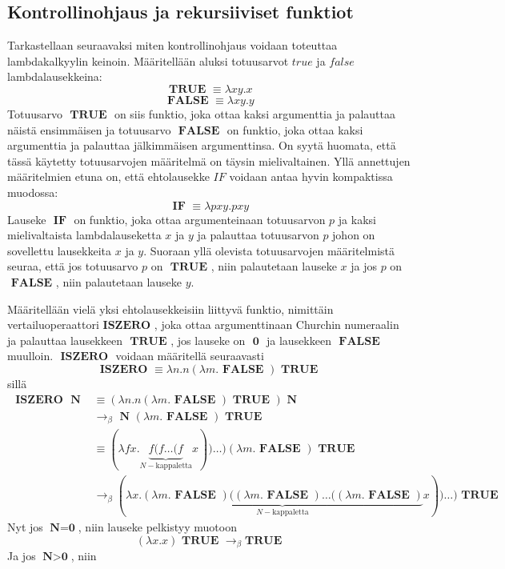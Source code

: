 \subsection{Kontrollinohjaus ja rekursiiviset funktiot}
Tarkastellaan seuraavaksi miten kontrollinohjaus voidaan toteuttaa lambdakalkyylin keinoin. Määritellään aluksi totuusarvot $true$ ja $false$ lambdalausekkeina:
\[ \textbf{ TRUE } \equiv \lambda x y . x \]
\[ \textbf{ FALSE } \equiv \lambda x y . y \]
Totuusarvo $\textbf{ TRUE }$ on siis funktio, joka ottaa kaksi argumenttia ja palauttaa näistä ensimmäisen ja totuusarvo $\textbf{ FALSE }$ on funktio, joka ottaa kaksi argumenttia ja palauttaa jälkimmäisen argumenttinsa. On syytä huomata, että tässä käytetty totuusarvojen määritelmä on täysin mielivaltainen. Yllä annettujen määritelmien etuna on, että ehtolausekke $IF$ voidaan antaa hyvin kompaktissa muodossa:
\[ \textbf{ IF } \equiv \lambda p x y . p x y \]  
Lauseke $\textbf{ IF }$ on funktio, joka ottaa argumenteinaan totuusarvon $p$ ja kaksi mielivaltaista lambdalauseketta $x$ ja $y$ ja palauttaa totuusarvon $p$ johon on sovellettu lausekkeita $x$ ja $y$. Suoraan yllä olevista totuusarvojen määritelmistä seuraa, että jos totuusarvo $p$ on $\textbf{ TRUE }$, niin palautetaan lauseke $x$ ja jos $p$ on $\textbf{ FALSE }$, niin palautetaan lauseke $y$.
\par 
Määritellään vielä yksi ehtolausekkeisiin liittyvä funktio, nimittäin vertailuoperaattori$\textbf{ ISZERO }$, joka ottaa argumenttinaan Churchin numeraalin ja palauttaa lausekkeen $\textbf{ TRUE }$, jos lauseke on $\textbf{ 0 }$ ja lausekkeen $\textbf{ FALSE }$ muulloin. $\textbf{ ISZERO }$ voidaan määritellä seuraavasti
\[\textbf{ ISZERO } \equiv \lambda n . n (\lambda m . \textbf{ FALSE }) \textbf{ TRUE }  \]
sillä
\begin{align*}
\textbf{ ISZERO } \textbf{ N }
&\equiv (\lambda n . n (\lambda m . \textbf{ FALSE }) \textbf{ TRUE }) \textbf{ N } \\
&\rightarrow_{\beta} \textbf{ N } (\lambda m . \textbf{ FALSE }) \textbf{ TRUE } \\
&\equiv (\lambda fx . \underbrace{ f ( f \ldots (f }_{ N-\text{kappaletta}} x)) \ldots )  (\lambda m . \textbf{ FALSE }) \textbf{ TRUE } \\
&\rightarrow_{\beta} (\lambda x . \underbrace{ (\lambda m . \textbf{ FALSE }) ( (\lambda m . \textbf{ FALSE }) \ldots ((\lambda m . \textbf{ FALSE }) }_{ N-\text{kappaletta}} x)) \ldots ) \textbf{ TRUE }
\end{align*} 
Nyt jos $\textbf{N} = \textbf{0}$, niin lauseke pelkistyy muotoon
\[ (\lambda x . x) \textbf{ TRUE } \rightarrow_{\beta} \textbf{TRUE} \]
Ja jos $\textbf{N} > \textbf{0}$, niin

